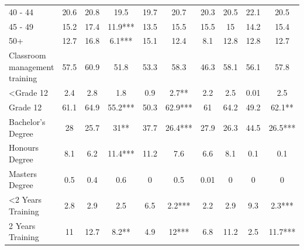 \documentclass[12pt,preprint, authoryear]{article}
\numberwithin{equation}{section}
\numberwithin{figure}{section}
\numberwithin{table}{section}
\begin{document}
\begin{longtable}[htbp] {p{5cm}|c|*{2}{c}|*{2}{c}|*{2}{c}|*{2}{c}}
40 - 44                          & 20.6         & 20.8                  & 19.5                        & 19.7                          & 20.7                        & 20.3 & 20.5    & 22.1 & 20.5    \\
45 - 49                          & 15.2         & 17.4                  & 11.9***                     & 13.5                          & 15.5                        & 15.5 & 15      & 14.2 & 15.4    \\
50+                              & 12.7         & 16.8                  & 6.1***                      & 15.1                          & 12.4                        & 8.1  & 12.8    & 12.8 & 12.7    \\
Classroom management training    & 57.5         & 60.9                  & 51.8                        & 53.3                          & 58.3                        & 46.3 & 58.1    & 56.1 & 57.8    \\
<Grade 12               & 2.4          & 2.8                   & 1.8                         & 0.9                           & 2.7**                       & 2.2  & 2.5     & 0.01 & 2.5     \\
Grade 12                         & 61.1         & 64.9                  & 55.2***                     & 50.3                          & 62.9***                     & 61   & 64.2    & 49.2 & 62.1**  \\
Bachelor's Degree                & 28           & 25.7                  & 31**                        & 37.7                          & 26.4***                     & 27.9 & 26.3    & 44.5 & 26.5*** \\
Honours Degree                   & 8.1          & 6.2                   & 11.4***                     & 11.2                          & 7.6                         & 6.6  & 8.1     & 0.1  & 0.1     \\
Masters Degree                   & 0.5          & 0.4                   & 0.6                         & 0                             & 0.5                         & 0.01 & 0       & 0    & 0       \\
<2 Years Training        & 2.8          & 2.9                   & 2.5                         & 6.5                           & 2.2***                      & 2.2  & 2.9     & 9.3  & 2.3***  \\
2 Years Training                 & 11           & 12.7                  & 8.2**                       & 4.9                           & 12***                       & 6.8  & 11.2    & 2.5  & 11.7*** \\

\end{longtable}
\end{document}
